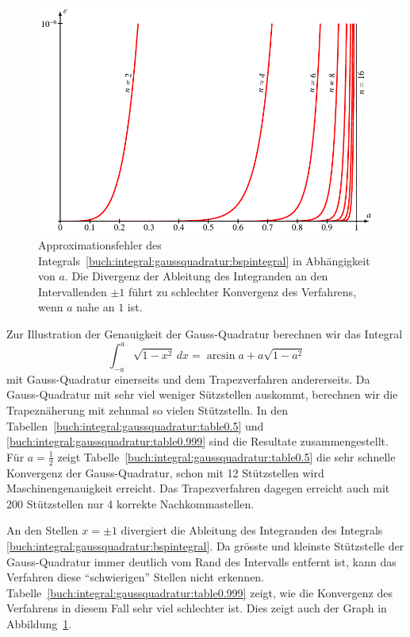 \begin{figure}
\centering
\includegraphics{chapters/060-integral/gq/gq.pdf}
\caption{Approximationsfehler des
Integrals~\eqref{buch:integral:gaussquadratur:bspintegral}
in Abhängigkeit von $a$.
Die Divergenz der Ableitung des Integranden an den Intervallenden
$\pm 1$ führt zu schlechter Konvergenz des Verfahrens, wenn $a$
nahe an $1$ ist.
\label{buch:integral:gaussquadratur:fehler}}
\end{figure}

Zur Illustration der Genauigkeit der Gauss-Quadratur berechnen wir
das Integral
\begin{equation}
\int_{-a}^a \sqrt{1-x^2}\,dx
=
\arcsin a + a \sqrt{1-a^2}
\label{buch:integral:gaussquadratur:bspintegral}
\end{equation}
mit Gauss-Quadratur einerseits und dem Trapezverfahren
andererseits.
Da Gauss-Quadratur mit sehr viel weniger Sützstellen auskommt,
berechnen wir die Trapeznäherung mit zehnmal so vielen Stützstelln.
In den Tabellen~\ref{buch:integral:gaussquadratur:table0.5}
und
\ref{buch:integral:gaussquadratur:table0.999}
sind die Resultate zusammengestellt.
Für $a =\frac12$ zeigt
Tabelle~\ref{buch:integral:gaussquadratur:table0.5}
die sehr schnelle Konvergenz der Gauss-Quadratur, schon mit
12 Stützstellen wird Maschinengenauigkeit erreicht.
Das Trapezverfahren dagegen erreicht auch mit 200 Stützstellen nur
4 korrekte Nachkommastellen.

An den Stellen $x=\pm 1$ divergiert die Ableitung des Integranden
des Integrals \eqref{buch:integral:gaussquadratur:bspintegral}.
Da grösste und kleinste Stützstelle der Gauss-Quadratur immer
deutlich vom Rand des Intervalls entfernt ist, kann das Verfahren
diese ``schwierigen'' Stellen nicht erkennen.
Tabelle~\ref{buch:integral:gaussquadratur:table0.999} zeigt, wie
die Konvergenz des Verfahrens in diesem Fall sehr viel schlechter ist.
Dies zeigt auch der Graph in
Abbildung~\ref{buch:integral:gaussquadratur:fehler}.

